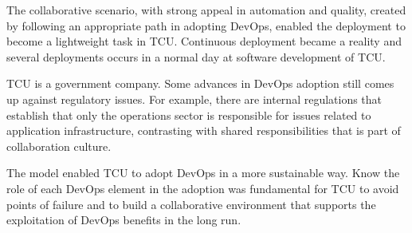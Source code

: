The collaborative scenario, with strong appeal in automation and quality, created by following an appropriate path in adopting DevOps, enabled the deployment to become a lightweight task in TCU. Continuous deployment became a reality and several deployments occurs in a normal day at software development of TCU.

TCU is a government company. Some advances in DevOps adoption still comes up
against regulatory issues. For example, there are internal regulations that
establish that only the operations sector is responsible for issues related to
application infrastructure, contrasting with shared responsibilities that is
part of collaboration culture.

The model enabled TCU to adopt DevOps in a more sustainable way. Know the role
of each DevOps element in the adoption was fundamental for TCU to avoid points
of failure and to build a collaborative environment that supports the
exploitation of DevOps benefits in the long run.
